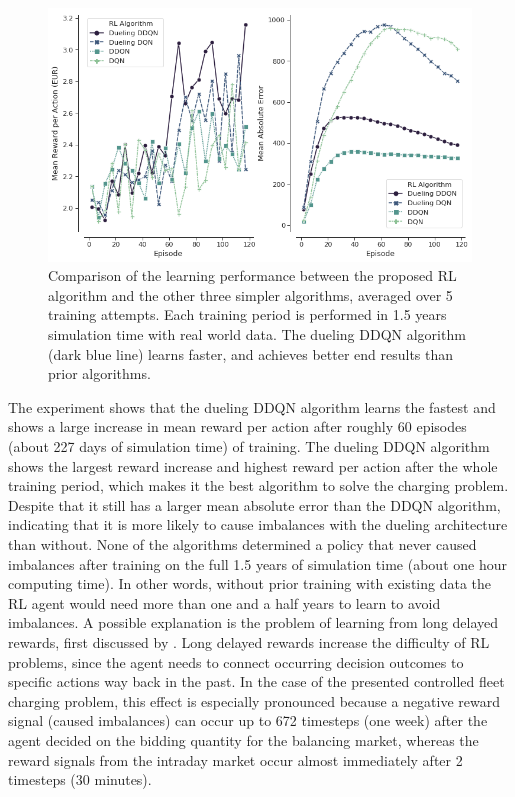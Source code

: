 \documentclass[a4paper, 12pt]{article}
\let\textcite\shortciteA
\begin{document}
\begin{figure}[h]
\centering
\includegraphics[width=1\linewidth]{./fig/rl-learning.png}
\caption[Comparison of RL algorithm learning performance]{Comparison of the learning performance between the proposed RL algorithm and the other three simpler algorithms, averaged over 5 training attempts. Each training period is performed in 1.5 years simulation time with real world data. The dueling DDQN algorithm (dark blue line) learns faster, and achieves better end results than prior algorithms. \label{fig-rl-learning}}
\end{figure}

The experiment shows that the dueling DDQN algorithm learns the fastest and
shows a large increase in mean reward per action after roughly 60 episodes
(about 227 days of simulation time) of training. The dueling DDQN algorithm
shows the largest reward increase and highest reward per action after the whole
training period, which makes it the best algorithm to solve the charging
problem. Despite that it still has a larger mean absolute error than the DDQN
algorithm, indicating that it is more likely to cause imbalances with the
dueling architecture than without. None of the algorithms determined a policy
that never caused imbalances after training on the full 1.5 years of simulation
time (about one hour computing time). In other words, without prior training
with existing data the RL agent would need more than one and a half years to
learn to avoid imbalances. A possible explanation is the problem of learning
from long delayed rewards, first discussed by
\textcite{watkins89_learn_from_delay_rewar}. Long delayed rewards increase the
difficulty of RL problems, since the agent needs to connect occurring decision
outcomes to specific actions way back in the past. In the case of the presented
controlled fleet charging problem, this effect is especially pronounced because
a negative reward signal (caused imbalances) can occur up to 672 timesteps (one
week) after the agent decided on the bidding quantity for the balancing market,
whereas the reward signals from the intraday market occur almost immediately
after 2 timesteps (30 minutes).
\end{document}

